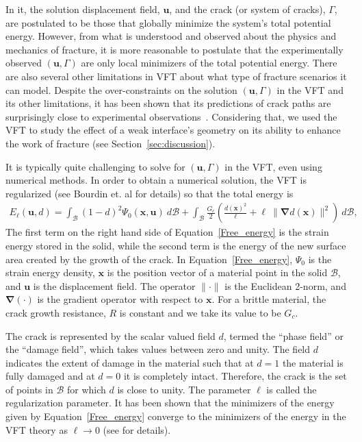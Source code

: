 \documentclass[12pt,onecolumn]{article}
\newcommand{\bs}[1]{\ensuremath{\mathbf{#1}}}
\begin{document}
\begin{bibunit}
In it, the solution displacement field, $\bs{u}$, and the  crack (or system of cracks), $\Gamma$, are postulated to be those that globally minimize the system's total potential energy. However, from what is understood and observed about the  physics and mechanics of fracture, it is more reasonable to postulate that the experimentally observed $(\bs{u},\Gamma)$ are only local minimizers of the total potential energy. There are also several other limitations in VFT about what type of fracture scenarios it can model. Despite  the over-constraints on the solution $(\bs{u},\Gamma)$ in the VFT and its other limitations, it has been shown that its  predictions of crack paths are surprisingly close to experimental observations~\cite{borden_2012,bourdin2000numerical}. Considering that, we used the VFT to study the effect of a weak interface's geometry on its ability to enhance the work of fracture (see Section~\ref{sec:discussion}). 
 
It is typically quite challenging to solve for $(\bs{u},\Gamma)$ in the VFT, even using numerical methods. In order to obtain a numerical solution, the VFT is regularized (see Bourdin et. al \cite{bourdin2000numerical} for details) so that the total energy is 
%
  \begin{align}\label{Free_energy}
	E_{\ell}(\bs{u},d) = \int_\mathcal{B} (1-d)^2\Psi_0(\bs{x},\bs{u}) \ d\mathcal{B} + \int_\mathcal{B} \frac{G_c}{2} \left(\frac{d(\bs{x})^2}{\ell} + \ell~ \lVert\bm{\nabla}d(\bs{x})\rVert^2\right) \ d\mathcal{B},  
\end{align}
%
The first term on the right hand side of Equation~\eqref{Free_energy} is the strain energy stored in the solid, while the second term is the energy of the new surface area created by the growth of the crack. In Equation~\eqref{Free_energy}, $\Psi_0$ is the strain energy density, $\bs{x}$ is the position vector of a material point in the solid $\mathcal{B}$, and $\bs{u}$ is the displacement field. The operator $\lVert \cdot \rVert$ is the Euclidean 2-norm, and $\bm{\nabla}(\cdot)$ is the gradient operator with respect to $\bs{x}$. For a brittle material, the crack growth resistance, $R$ is constant and we take its value to be $G_c$.

The crack is represented by the scalar valued field $d$, termed the ``phase field'' or the ``damage field'', which takes values between zero and unity. The field $d$ indicates the extent of damage in the material such that at $d=1$ the material is fully damaged  and at $d=0$ it is completely intact. Therefore, the crack is the set of points in $\mathcal{B}$ for which $d$ is close to unity. The parameter $\ell$ is called the regularization parameter. It has been shown  that the minimizers of the energy given by Equation~\eqref{Free_energy} converge to the minimizers of the energy in the VFT theory as $\ell \to 0$ (see \cite{chambolle_2005,ambrosio_1990a,bourdin_2008} for details). 
 

\end{bibunit}
\end{document}
